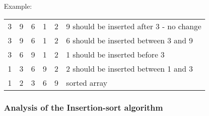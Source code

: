 \documentclass{article}
\begin{document}
    Example:
    \begin{center}
        \begin{tabular}{ccccc|l}
            3 & 9 & 6 & 1 & 2 & 9 should be inserted after 3 - no change \\
            3 & 9 & 6 & 1 & 2 & 6 should be inserted between 3 and 9 \\
            3 & 6 & 9 & 1 & 2 & 1 should be inserted before 3 \\
            1 & 3 & 6 & 9 & 2 & 2 should be inserted between 1 and 3 \\
            1 & 2 & 3 & 6 & 9 & sorted array\\
        \end{tabular}
    \end{center}

    \subsubsection*{Analysis of the Insertion-sort algorithm}
\end{document}
